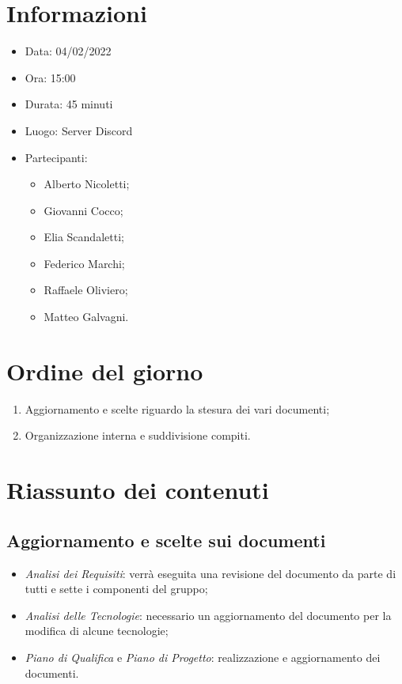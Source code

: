 \documentclass[a4paper, 12pt]{article}
\begin{document}
\makefrontpage

\section{Informazioni}

\begin{itemize}
\item Data: 04/02/2022
\item Ora: 15:00
\item Durata: 45 minuti
\item Luogo: Server Discord
\item Partecipanti:
\begin{itemize}
\item Alberto Nicoletti;
\item Giovanni Cocco;
\item Elia Scandaletti;
\item Federico Marchi;
\item Raffaele Oliviero;
\item Matteo Galvagni.
\end{itemize}
\end{itemize}

\section{Ordine del giorno}
\begin{enumerate}
    \item Aggiornamento e scelte riguardo la stesura dei vari documenti;
    \item Organizzazione interna e suddivisione compiti.
\end{enumerate}

\section{Riassunto dei contenuti}

\subsection{Aggiornamento e scelte sui documenti}
\begin{itemize}
    \item \textit{Analisi dei Requisiti}: verrà eseguita una revisione del documento da parte di tutti e sette i componenti del gruppo;
    \item \textit{Analisi delle Tecnologie}: necessario un aggiornamento del documento per la modifica di alcune tecnologie;
    \item \textit{Piano di Qualifica} e \textit{Piano di Progetto}: realizzazione e aggiornamento dei documenti.
\end{itemize}
\end{document}
